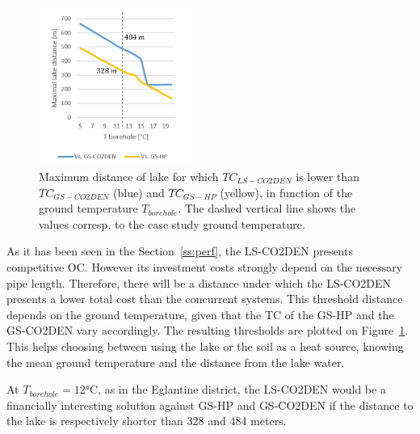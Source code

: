 \documentclass{article}
\begin{document}
\begin{figure} 
	\vspace{-20pt}
	\centering
	\includegraphics[width=0.45\textwidth]{lakeDist.png}
	\caption{Maximum distance of lake for which $TC_{LS-CO2DEN}$ is lower than $TC_{GS-CO2DEN}$ (blue) and $TC_{GS-HP}$ (yellow), in function of the ground temperature $T_{borehole}$. The dashed vertical line shows the values corresp. to the case study ground temperature.}
	\label{fig:lakeDist}
	\vspace{-23pt}
\end{figure}

As it has been seen in the Section~\ref{ss:perf}, the LS-CO2DEN presents competitive OC. However its investment costs strongly depend on the necessary pipe length. Therefore, there will be a distance under which the LS-CO2DEN presents a lower total cost than the concurrent systems. This threshold distance depends on the ground temperature, given that the TC of the GS-HP and the GS-CO2DEN vary accordingly. The resulting thresholds are plotted on Figure~\ref{fig:lakeDist}. This helps choosing between using the lake or the soil as a heat source, knowing the mean ground temperature and the distance from the lake water.


At $T_{borehole} = 12 \si{\celsius}$, as in the Eglantine district, the LS-CO2DEN would be a financially interesting solution against  GS-HP and GS-CO2DEN if the distance to the lake is respectively shorter than 328 and 484 meters.
\end{document}

